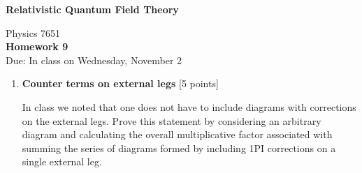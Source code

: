 \documentclass[12pt]{article}
\begin{document}
\vspace*{-1cm}
\begin{center}
{\LARGE \bf Relativistic Quantum Field Theory}

\vspace*{0.5cm}
{\Large Physics 7651} \\
\vspace*{0.5cm}
{\Large {\bf Homework 9}\\
\vspace*{0.5cm}
Due: In class on Wednesday, November 2}
\end{center}
\begin{enumerate}



\item {\bf Counter terms on external legs} [5 points]

In class we noted that one does not have to include diagrams with corrections on the external legs. Prove this statement by considering an arbitrary diagram and calculating the overall multiplicative factor associated with summing the series of diagrams formed by including 1PI corrections on a single external leg.

\begin{center}


\end{center}
\end{enumerate}
\end{document}
